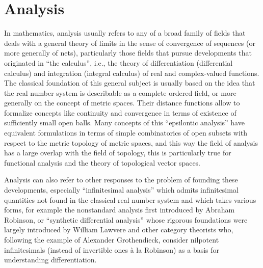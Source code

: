 \documentclass[main.tex]{subfiles}
\begin{document}
\chapter{Analysis}
In mathematics, analysis usually refers to any of a broad family of fields that deals with a general theory of limits in the sense of convergence of sequences (or more generally of nets), particularly those fields that pursue developments that originated in “the calculus”, i.e., the theory of differentiation (differential calculus) and integration (integral calculus) of real and complex-valued functions. The classical foundation of this general subject is usually based on the idea that the real number system is describable as a complete ordered field, or more generally on the concept of metric spaces. Their distance functions allow to formalize concepts like continuity and convergence in terms of existence of sufficiently small open balls. Many concepts of this “epsilontic analysis” have equivalent formulations in terms of simple combinatorics of open subsets with respect to the metric topology of metric spaces, and this way the field of analysis has a large overlap with the field of topology, this is particularly true for functional analysis and the theory of topological vector spaces.

Analysis can also refer to other responses to the problem of founding these developments, especially “infinitesimal analysis” which admits infinitesimal quantities not found in the classical real number system and which takes various forms, for example the nonstandard analysis first introduced by Abraham Robinson, or “synthetic differential analysis” whose rigorous foundations were largely introduced by William Lawvere and other category theorists who, following the example of Alexander Grothendieck, consider nilpotent infinitesimals (instead of invertible ones à la Robinson) as a basis for understanding differentiation.


\end{document}
